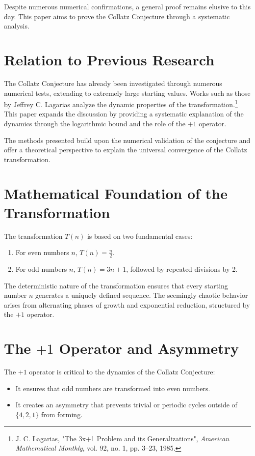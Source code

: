 \documentclass[a4paper,12pt]{article}
\begin{document}
Despite numerous numerical confirmations, a general proof remains elusive to this day. This paper aims to prove the Collatz Conjecture through a systematic analysis.
\section{Relation to Previous Research}
The Collatz Conjecture has already been investigated through numerous numerical tests, extending to extremely large starting values. Works such as those by Jeffrey C. Lagarias analyze the dynamic properties of the transformation.\footnote{J. C. Lagarias, "The 3x+1 Problem and its Generalizations", \textit{American Mathematical Monthly}, vol. 92, no. 1, pp. 3–23, 1985.} This paper expands the discussion by providing a systematic explanation of the dynamics through the logarithmic bound and the role of the \(+1\) operator.

The methods presented build upon the numerical validation of the conjecture and offer a theoretical perspective to explain the universal convergence of the Collatz transformation.

\section{Mathematical Foundation of the Transformation}
The transformation \( T(n) \) is based on two fundamental cases:
\begin{enumerate}
    \item For even numbers \( n \), \( T(n) = \frac{n}{2} \).
    \item For odd numbers \( n \), \( T(n) = 3n + 1 \), followed by repeated divisions by 2.
\end{enumerate}

The deterministic nature of the transformation ensures that every starting number \( n \) generates a uniquely defined sequence. The seemingly chaotic behavior arises from alternating phases of growth and exponential reduction, structured by the \(+1\) operator.

\section{The \(+1\) Operator and Asymmetry}
The \(+1\) operator is critical to the dynamics of the Collatz Conjecture:
\begin{itemize}
    \item It ensures that odd numbers are transformed into even numbers.
    \item It creates an asymmetry that prevents trivial or periodic cycles outside of \( \{4, 2, 1\} \) from forming.
\end{itemize}
\end{document}
